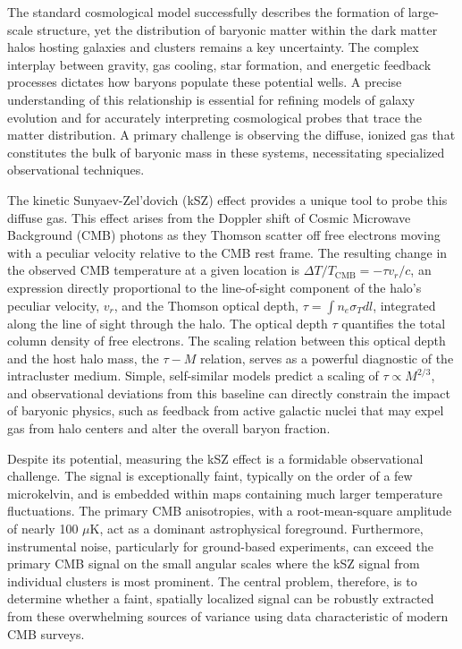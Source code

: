 \documentclass[]{article}
\begin{document}
The standard cosmological model successfully describes the formation of large-scale structure, yet the distribution of baryonic matter within the dark matter halos hosting galaxies and clusters remains a key uncertainty. The complex interplay between gravity, gas cooling, star formation, and energetic feedback processes dictates how baryons populate these potential wells. A precise understanding of this relationship is essential for refining models of galaxy evolution and for accurately interpreting cosmological probes that trace the matter distribution. A primary challenge is observing the diffuse, ionized gas that constitutes the bulk of baryonic mass in these systems, necessitating specialized observational techniques.

The kinetic Sunyaev-Zel'dovich (kSZ) effect provides a unique tool to probe this diffuse gas. This effect arises from the Doppler shift of Cosmic Microwave Background (CMB) photons as they Thomson scatter off free electrons moving with a peculiar velocity relative to the CMB rest frame. The resulting change in the observed CMB temperature at a given location is $\Delta T / T_{\text{CMB}} = - \tau v_r / c$, an expression directly proportional to the line-of-sight component of the halo's peculiar velocity, $v_r$, and the Thomson optical depth, $\tau = \int n_e \sigma_T dl$, integrated along the line of sight through the halo. The optical depth $\tau$ quantifies the total column density of free electrons. The scaling relation between this optical depth and the host halo mass, the $\tau-M$ relation, serves as a powerful diagnostic of the intracluster medium. Simple, self-similar models predict a scaling of $\tau \propto M^{2/3}$, and observational deviations from this baseline can directly constrain the impact of baryonic physics, such as feedback from active galactic nuclei that may expel gas from halo centers and alter the overall baryon fraction.

Despite its potential, measuring the kSZ effect is a formidable observational challenge. The signal is exceptionally faint, typically on the order of a few microkelvin, and is embedded within maps containing much larger temperature fluctuations. The primary CMB anisotropies, with a root-mean-square amplitude of nearly 100 $\mu$K, act as a dominant astrophysical foreground. Furthermore, instrumental noise, particularly for ground-based experiments, can exceed the primary CMB signal on the small angular scales where the kSZ signal from individual clusters is most prominent. The central problem, therefore, is to determine whether a faint, spatially localized signal can be robustly extracted from these overwhelming sources of variance using data characteristic of modern CMB surveys.
\end{document}

